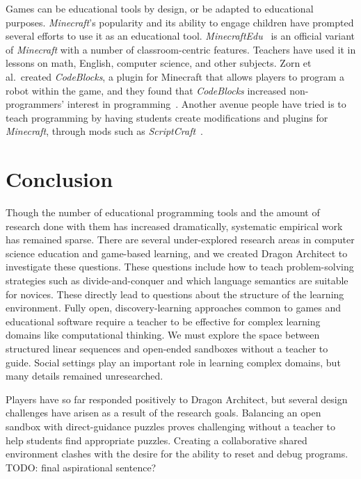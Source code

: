 \documentclass{sig-alternate}
\newcommand{\TODO}[1]{{\color{red} TODO: #1}}
\newcommand{\gametitle}{{Dragon Architect}}
\begin{document}
Games can be educational tools by design, or be adapted to educational purposes. 
\emph{Minecraft}'s popularity and its ability to engage children have prompted several efforts to use it as an educational tool.
\emph{MinecraftEdu}~\cite{minecraftedu} is an official variant of \emph{Minecraft} with a number of classroom-centric features. 
Teachers have used it in lessons on math, English, computer science, and other subjects.  
Zorn et al.\ created \emph{CodeBlocks}, a plugin for Minecraft that allows players to program a robot within the game, and they found that \emph{CodeBlocks} increased non-programmers' interest in programming~\cite{zorn2013minecraft}.
Another avenue people have tried is to teach programming by having students create modifications and plugins for \emph{Minecraft}, through mods such as \emph{ScriptCraft}~\cite{scriptcraft}.

\section{Conclusion}

Though the number of educational programming tools and the amount of research done with them has increased dramatically, systematic empirical work has remained sparse.
There are several under-explored research areas in computer science education and game-based learning, and we created \gametitle{} to investigate these questions.
These questions include how to teach problem-solving strategies such as divide-and-conquer and which language semantics are suitable for novices.
These directly lead to questions about the structure of the learning environment.
Fully open, discovery-learning approaches common to games and educational software require a teacher to be effective for complex learning domains like computational thinking.
We must explore the space between structured linear sequences and open-ended sandboxes without a teacher to guide.
Social settings play an important role in learning complex domains, but many details remained unresearched.

Players have so far responded positively to \gametitle{}, but several design challenges have arisen as a result of the research goals.
Balancing an open sandbox with direct-guidance puzzles proves challenging without a teacher to help students find appropriate puzzles.
Creating a collaborative shared environment clashes with the desire for the ability to reset and debug programs.
\TODO{final aspirational sentence?}



 
\end{document}
